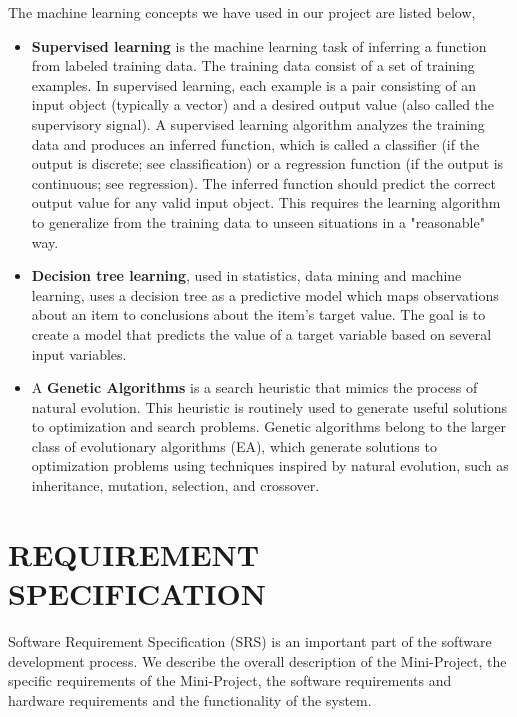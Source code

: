 \documentclass[12pt]{report}
\begin{document}
The machine learning concepts we have used in our project are listed below,
\begin{itemize}


\item{\textbf{Supervised learning}}  is the machine learning task of inferring a function from labeled training data. The training data consist of a set of training examples. In supervised learning, each example is a pair consisting of an input object (typically a vector) and a desired output value (also called the supervisory signal). A supervised learning algorithm analyzes the training data and produces an inferred function, which is called a classifier (if the output is discrete; see classification) or a regression function (if the output is continuous; see regression). The inferred function should predict the correct output value for any valid input object. This requires the learning algorithm to generalize from the training data to unseen situations in a "reasonable" way.

\item{\textbf{Decision tree learning}}, used in statistics, data mining and machine learning, uses a decision tree as a predictive model which maps observations about an item to conclusions about the item's target value. The goal is to create a model that predicts the value of a target variable based on several input variables.

\item A {\textbf{Genetic Algorithms}} is a search heuristic that mimics the process of natural evolution. This heuristic is routinely used to generate useful solutions to optimization and search problems. Genetic algorithms belong to the larger class of evolutionary algorithms (EA), which generate solutions to optimization problems using techniques inspired by natural evolution, such as inheritance, mutation, selection, and crossover.

\end{itemize}


\pagestyle{fancy}
\chead{}
\rfoot{\small{\thepage}}
\renewcommand{\headrulewidth}{0.4pt}
\renewcommand{\footrulewidth}{0.4pt}
\chapter{REQUIREMENT SPECIFICATION}
Software Requirement Specification (SRS) is an important part of the  software development process. We describe the overall description of the Mini-Project, the specific requirements of the Mini-Project, the software requirements and hardware requirements and the functionality of the system.
\end{document}
